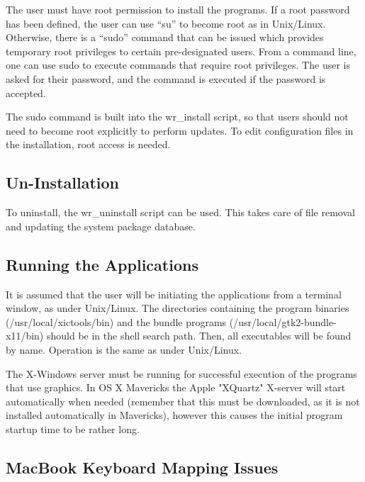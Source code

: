 The user must have root permission to install the programs.  If a root
password has been defined, the user can use ``{\vt su}'' to become
root as in Unix/Linux.  Otherwise, there is a ``{\vt sudo}'' command
that can be issued which provides temporary root privileges to certain
pre-designated users.  From a command line, one can use {\vt sudo} to
execute commands that require root privileges.  The user is asked for
their password, and the command is executed if the password is
accepted.

The {\vt sudo} command is built into the {\vt wr\_install} script, so
that users should not need to become root explicitly to perform
updates.  To edit configuration files in the installation, root access
is needed.

\subsection{Un-Installation}

To uninstall, the {\vt wr\_uninstall} script can be used.  This takes
care of file removal and updating the system package database.

\subsection{Running the Applications}

It is assumed that the user will be initiating the applications from a
terminal window, as under Unix/Linux.  The directories containing the
program binaries ({\vt /usr/local/xictools/bin}) and the bundle
programs ({\vt /usr/local/gtk2-bundle-x11/bin}) should be in the
shell search path.  Then, all executables will be found by name. 
Operation is the same as under Unix/Linux.

The X-Windows server must be running for successful execution of the
programs that use graphics.  In OS X Mavericks the Apple "XQuartz"
X-server will start automatically when needed (remember that this must
be downloaded, as it is not installed automatically in Mavericks),
however this causes the initial program startup time to be rather
long.

\subsection{MacBook Keyboard Mapping Issues}

